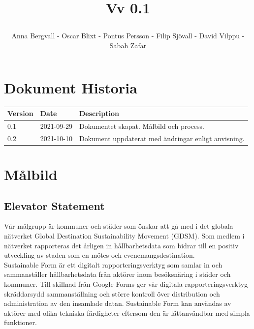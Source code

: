 \documentclass{article}
\date {#1}
\title {
    \documentNumber {01}    

    \documentTitle {Helsingborg Event and Convention Bureau}
    
    \documentDate {2021-09-29}
    \documentVersion Vv 0.1
    
    \author{Anna Bergvall - Oscar Blixt - Pontus Persson - Filip Sjövall - David Vilppu - Sabah Zafar}
}
\begin{document}
\maketitle

\thispagestyle{empty}



\newpage

\tableofcontents


\newpage

\section{Dokument Historia}
\begin{tabular}{ l | l | l }
    Version & Date & Description \\
    \hline
    0.1 & 2021-09-29 & Dokumentet skapat. Målbild och process. \\
    \hline
    0.2 & 2021-10-10 & Dokument uppdaterat med ändringar enligt anvisning. \\
    \hline
   
\end{tabular}

\newpage

\section{Målbild}
\subsection{Elevator Statement}


Vår målgrupp är kommuner och städer som önskar att gå med i det globala nätverket Global
Destination Sustainability Movement (GDSM). Som medlem i nätverket rapporteras det
årligen in hållbarhetsdata som bidrar till en positiv utveckling av staden som en mötes-och
evenemangsdestination. \\ \indent Sustainable Form är ett digitalt rapporteringsverktyg som samlar in
och sammanställer hållbarhetsdata från aktörer inom besöksnäring i städer och kommuner.
Till skillnad från Google Forms ger vår digitala rapporteringsverktyg skräddarsydd
sammanställning och större kontroll över distribution och administration av den insamlade
datan. Sustainable Form kan användas av aktörer med olika tekniska färdigheter eftersom den
är lättanvändbar med simpla funktioner.
\end{document}
